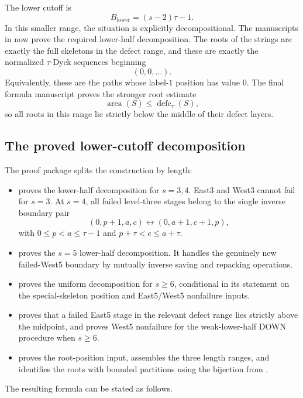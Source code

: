 \documentclass[11pt]{article}
\newcommand{\area}{\operatorname{area}}
\newcommand{\defc}{\operatorname{defc}}
\begin{document}
The lower cutoff is
\[
  B_{\mathrm{lower}}=(s-2)\tau-1.
\]
In this smaller range, the situation is explicitly decompositional.  The
manuscripts in
 now prove the required lower-half decomposition.
The roots of the strings are exactly the full skeletons in the defect range,
and these are exactly the normalized \(\tau\)-Dyck sequences beginning
\[
  (0,0,\ldots).
\]
Equivalently, these are the paths whose label-\(1\) position has value \(0\).
The final formula manuscript proves the stronger root estimate
\[
  \area(S)\le\defc_\tau(S),
\]
so all roots in this range lie strictly below the middle of their defect
layers.

\subsection{The proved lower-cutoff decomposition}

The proof package splits the construction by length:
\begin{itemize}
\item {} proves the lower-half
  decomposition for \(s=3,4\).  East3 and West3 cannot fail for \(s=3\).
  At \(s=4\), all failed level-three stages belong to the single inverse
  boundary pair
  \[
    (0,p+1,a,c)\longleftrightarrow(0,a+1,c+1,p),
  \]
  with \(0\le p<a\le\tau-1\) and \(p+\tau<c\le a+\tau\).
\item {} proves the \(s=5\)
  lower-half decomposition.  It handles the genuinely new failed-West5
  boundary by mutually inverse saving and repacking operations.
\item {} proves the uniform
  decomposition for \(s\ge6\), conditional in its statement on the
  special-skeleton position and East5/West5 nonfailure inputs.
\item {} proves that a failed
  East5 stage in the relevant defect range lies strictly above the midpoint,
  and  proves West5 nonfailure
  for the weak-lower-half DOWN procedure when \(s\ge6\).
\item {} proves the root-position
  input, assembles the three length ranges, and identifies the roots with
  bounded partitions using the bijection from \cite{Hawkes2022}.
\end{itemize}

The resulting formula can be stated as follows.
\end{document}
